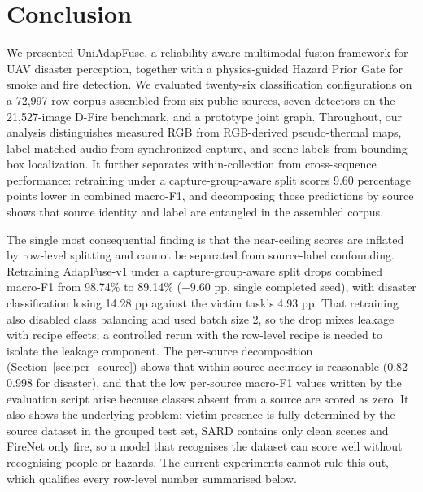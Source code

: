 \documentclass[journal]{IEEEtran}
\begin{document}
\section{Conclusion}


We presented UniAdapFuse, a reliability-aware multimodal fusion framework for UAV disaster perception, together with a physics-guided Hazard Prior Gate for smoke and fire detection. We evaluated twenty-six classification configurations on a 72{,}997-row corpus assembled from six public sources, seven detectors on the 21{,}527-image D-Fire benchmark, and a prototype joint graph. Throughout, our analysis distinguishes measured RGB from RGB-derived pseudo-thermal maps, label-matched audio from synchronized capture, and scene labels from bounding-box localization. It further separates within-collection from cross-sequence performance: retraining under a capture-group-aware split scores 9.60 percentage points lower in combined macro-F1, and decomposing those predictions by source shows that source identity and label are entangled in the assembled corpus.

The single most consequential finding is that the near-ceiling scores are inflated by row-level splitting and cannot be separated from source-label confounding. Retraining AdapFuse-v1 under a capture-group-aware split drops combined macro-F1 from 98.74\% to 89.14\% ($-9.60$ pp, single completed seed), with disaster classification losing 14.28 pp against the victim task's 4.93 pp. That retraining also disabled class balancing and used batch size 2, so the drop mixes leakage with recipe effects; a controlled rerun with the row-level recipe is needed to isolate the leakage component. The per-source decomposition (Section~\ref{sec:per_source}) shows that within-source accuracy is reasonable (0.82--0.998 for disaster), and that the low per-source macro-F1 values written by the evaluation script arise because classes absent from a source are scored as zero. It also shows the underlying problem: victim presence is fully determined by the source dataset in the grouped test set, SARD contains only clean scenes and FireNet only fire, so a model that recognises the dataset can score well without recognising people or hazards. The current experiments cannot rule this out, which qualifies every row-level number summarised below.
\end{document}
